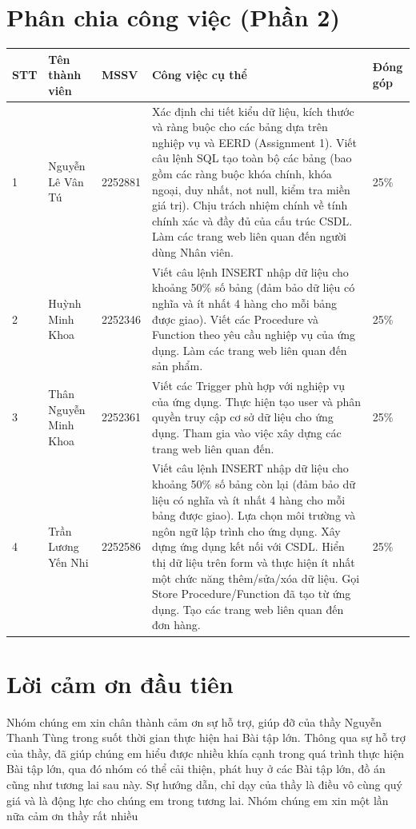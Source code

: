 \documentclass[a4paper,twoside]{article}
\begin{document}
\newpage
\section*{Phân chia công việc (Phần 2)}
\begin{tabular}{|p{0.8cm}|p{1.3cm}|p{1.5cm}|p{10cm}|p{1.5cm}|}
    \hline
    STT  & Tên thành viên & MSSV & Công việc cụ thể & Đóng góp\\ \hline
       1& Nguyễn Lê Vân Tú & 2252881 & Xác định chi tiết kiểu dữ liệu, kích thước và ràng buộc cho các bảng dựa trên nghiệp vụ và EERD (Assignment 1). 
       Viết câu lệnh SQL tạo toàn bộ các bảng (bao gồm các ràng buộc khóa chính, khóa ngoại, duy nhất, not null, kiểm tra miền giá trị). 
       Chịu trách nhiệm chính về tính chính xác và đầy đủ của cấu trúc CSDL. Làm các trang web liên quan đến người dùng Nhân viên.
        & 25\%  \\ \hline
       2& Huỳnh Minh Khoa & 2252346 & Viết câu lệnh INSERT nhập dữ liệu cho khoảng 50\% số bảng (đảm bảo dữ liệu có nghĩa và ít nhất 4 hàng cho mỗi bảng được giao). 
       Viết các Procedure và Function theo yêu cầu nghiệp vụ của ứng dụng. Làm các trang web liên quan đến sản phẩm.
        & 25\%  \\ \hline
       3& Thân Nguyễn Minh Khoa & 2252361 & Viết các Trigger phù hợp với nghiệp vụ của ứng dụng. 
       Thực hiện tạo user và phân quyền truy cập cơ sở dữ liệu cho ứng dụng. 
       Tham gia vào việc xây dựng các trang web liên quan đến.
        & 25\%  \\ \hline
       4& Trần Lương Yến Nhi & 2252586 & Viết câu lệnh INSERT nhập dữ liệu cho khoảng 50\% số bảng còn lại (đảm bảo dữ liệu có nghĩa và ít nhất 4 hàng cho mỗi bảng được giao). 
       Lựa chọn môi trường và ngôn ngữ lập trình cho ứng dụng. Xây dựng ứng dụng kết nối với CSDL.
       Hiển thị dữ liệu trên form và thực hiện ít nhất một chức năng thêm/sửa/xóa dữ liệu. Gọi Store Procedure/Function đã tạo từ ứng dụng.
       Tạo các trang web liên quan đến đơn hàng.
        & 25\% \\ \hline
    \end{tabular}

\newpage
\tableofcontents
\newpage
\section*{Lời cảm ơn đầu tiên}
Nhóm chúng em xin chân thành cảm ơn sự hỗ trợ, giúp đỡ của thầy Nguyễn Thanh Tùng trong suốt thời gian thực hiện hai Bài tập lớn. Thông qua sự hỗ trợ của thầy, đã giúp chúng em hiểu được nhiều khía cạnh trong quá trình thực hiện Bài tập lớn, qua đó nhóm có thể cải thiện, phát huy ở các Bài tập lớn, đồ án cũng như tương lai sau này. 
Sự hướng dẫn, chỉ dạy của thầy là điều vô cùng quý giá và là động lực cho chúng em trong tương lai.
Nhóm chúng em xin một lần nữa cảm ơn thầy rất nhiều
\newpage








\end{document}
